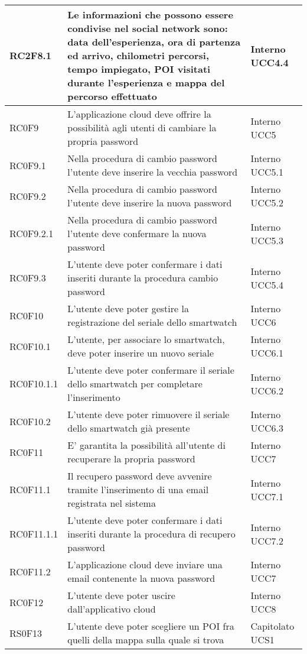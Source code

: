 \begin{center}
\begin{longtable}{|l|p{7cm}|p{1.7cm}|}
RC2F8.1		& Le informazioni che possono essere condivise nel social network sono: data dell'esperienza, ora di partenza ed arrivo, chilometri percorsi, tempo impiegato, POI visitati durante l'esperienza e mappa del percorso effettuato & Interno UCC4.4 \\\hline
RC0F9		& L'applicazione cloud deve offrire la possibilità agli utenti di cambiare la propria password & Interno UCC5 \\\hline
RC0F9.1		& Nella procedura di cambio password l'utente deve inserire la vecchia password & Interno UCC5.1 \\\hline
RC0F9.2		& Nella procedura di cambio password l'utente deve inserire la nuova password & Interno UCC5.2 \\\hline
RC0F9.2.1	& Nella procedura di cambio password l'utente deve confermare la nuova password & Interno UCC5.3 \\\hline
RC0F9.3		& L'utente deve poter confermare i dati inseriti durante la procedura cambio password & Interno UCC5.4 \\\hline
RC0F10		& L'utente deve poter gestire la registrazione del seriale dello smartwatch & Interno UCC6 \\\hline
RC0F10.1	& L'utente, per associare lo smartwatch, deve poter inserire un nuovo seriale & Interno UCC6.1 \\\hline
RC0F10.1.1	& L'utente deve poter confermare il seriale dello smartwatch per completare l'inserimento & Interno UCC6.2 \\\hline
RC0F10.2	& L'utente deve poter rimuovere il seriale dello smartwatch già presente & Interno UCC6.3 \\\hline
RC0F11		& E' garantita la possibilità all'utente di recuperare la propria password & Interno UCC7 \\\hline
RC0F11.1	& Il recupero password deve avvenire tramite l'inserimento di una email registrata nel sistema & Interno UCC7.1 \\\hline
RC0F11.1.1	& L'utente deve poter confermare i dati inseriti durante la procedura di recupero password & Interno UCC7.2 \\\hline
RC0F11.2	& L'applicazione cloud deve inviare una email contenente la nuova password & Interno UCC7 \\\hline
RC0F12		& L'utente deve poter uscire dall'applicativo cloud & Interno UCC8 \\\hline
RS0F13		& L'utente deve poter scegliere un POI fra quelli della mappa sulla quale si trova & Capitolato UCS1\\\hline

\end{longtable}
\end{center}
